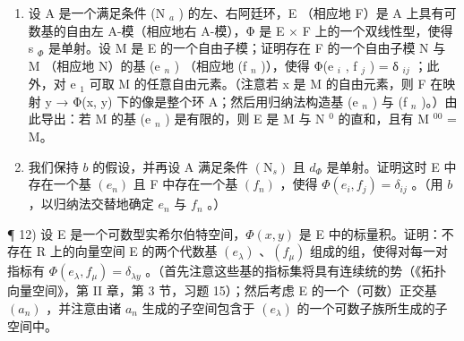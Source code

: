 \begin{enumerate}
\def\labelenumi{\alph{enumi})}
\setcounter{enumi}{1}
\item
  设 A 是一个满足条件 (N \(_{a}\) ) 的左、右阿廷环，E （相应地 F）是 A 上具有可数基的自由左 A-模（相应地右 A-模），Φ 是 E × F 上的一个双线性型，使得 s \(_{\Phi}\) 是单射。设 M 是 E 的一个自由子模；证明存在 F 的一个自由子模 N 与 M （相应地 N）的基 (e \(_{n}\) ) （相应地 (f \(_{n}\) )），使得 Φ(e \(_{i}\) , f \(_{j}\) ) = δ \(_{ij}\) ；此外，对 e \(_{1}\) 可取 M 的任意自由元素。（注意若 x 是 M 的自由元素，则 F 在映射 y → Φ(x, y) 下的像是整个环 A；然后用归纳法构造基 (e \(_{n}\) ) 与 (f \(_{n}\) )。）由此导出：若 M 的基 (e \(_{n}\) ) 是有限的，则 E 是 M 与 N \(^{0}\) 的直和，且有 M \(^{00}\) = M。
\item
  我们保持 \(b\) 的假设，并再设 A 满足条件 \((\mathrm{N}_{s})\) 且 \(d_{\Phi}\) 是单射。证明这时 E 中存在一个基 \((e_{n})\) 且 F 中存在一个基 \((f_{n})\) ，使得 \(\Phi(e_{i}, f_{j}) = \delta_{ij}\) 。（用 \(b\) ，以归纳法交替地确定 \(e_{n}\) 与 \(f_{n}\) 。）
\end{enumerate}

¶ 12) 设 E 是一个可数型实希尔伯特空间，\(\Phi(x, y)\) 是 E 中的标量积。证明：不存在 R 上的向量空间 E 的两个代数基 \((e_{\lambda})\) 、\((f_{\mu})\) 组成的组，使得对每一对指标有 \(\Phi(e_{\lambda}, f_{\mu}) = \delta_{\lambda y}\) 。（首先注意这些基的指标集将具有连续统的势（《拓扑向量空间》，第 II 章，第 3 节，习题 15）；然后考虑 E 的一个（可数）正交基 \((a_n)\) ，并注意由诸 \(a_n\) 生成的子空间包含于 \((e_{\lambda})\) 的一个可数子族所生成的子空间中。
\relax{}
